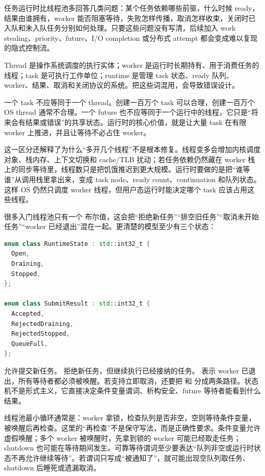 任务运行时比线程池多回答几类问题：某个任务依赖哪些前驱，什么时候 ready，结果由谁拥有，worker 能否阻塞等待，失败怎样传播，取消怎样收束，关闭时已入队和未入队任务分别如何处理。只要这些问题没有写清，后续加入 work stealing、priority、future、I/O completion 或分布式 attempt 都会变成难以复现的隐式控制流。

Thread 是操作系统调度的执行实体；worker 是运行时长期持有、用于消费任务的线程；task 是可执行工作单位；runtime 是管理 task 状态、ready 队列、worker、结果、取消和关闭协议的系统。把这些词混用，会导致错误设计。

一个 task 不应等同于一个 thread。创建一百万个 task 可以合理，创建一百万个 OS thread 通常不合理。一个 future 也不应等同于一个运行中的线程，它只是“将来会有结果或错误”的共享状态。运行时的核心价值，就是让大量 task 在有限 worker 上推进，并且让等待不必占住 worker。

这一区分还解释了为什么“多开几个线程”不是根本修复。线程变多会增加内核调度对象、栈内存、上下文切换和 cache/TLB 扰动；若任务依赖仍然藏在 worker 栈上的同步等待里，线程数只是把饥饿推迟到更大规模。运行时要做的是把“谁等谁”从调用栈里拿出来，变成 task node、ready count、continuation 和队列状态。这样 OS 仍然只调度 worker 线程，但用户态运行时能决定哪个 task 应该占用这些线程。

很多入门线程池只有一个  布尔值，这会把“拒绝新任务”“排空旧任务”“取消未开始任务”“worker 已经退出”混在一起。更清楚的模型至少有三个状态：

\begin{lstlisting}[language=C++,caption={运行时生命周期的最小枚举}]
enum class RuntimeState : std::int32_t {
  Open,
  Draining,
  Stopped,
};

enum class SubmitResult : std::int32_t {
  Accepted,
  RejectedDraining,
  RejectedStopped,
  QueueFull,
};
\end{lstlisting}

 允许提交新任务。 拒绝新任务，但继续执行已经接纳的任务。 表示 worker 已退出，所有等待者都必须被唤醒。若支持立即取消，还要把  和  分成两条路径。状态机不是形式主义，它直接决定条件变量谓词、析构安全、future 等待者能看到什么结果。

线程池最小循环通常是：worker 拿锁，检查队列是否非空，空则等待条件变量，被唤醒后再检查。这里的“再检查”不是保守写法，而是正确性要求。条件变量允许虚假唤醒；多个 worker 被唤醒时，先拿到锁的 worker 可能已经取走任务；shutdown 也可能在等待期间发生。可靠等待谓词至少要表达“队列非空或运行时状态不再允许继续等待”。若谓词只写成“被通知了”，就可能出现空队列取任务、shutdown 后睡死或遗漏取消。

